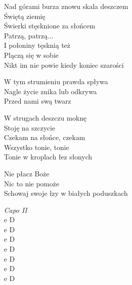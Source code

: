 \begin{text}
    \hfill\break
    Nad górami burza znowu skala deszczem\\
    Świętą ziemię\\
    Świerki stęsknione za słońcem\\
    Patrzą, patrzą...\\
    I połoniny tęsknią też\\
    Plączą się w sobie\\
    Nikt im nie powie kiedy koniec szarości

    W tym strumieniu prawda spływa\\
    Nagle życie znika lub odkrywa\\
    Przed nami swą twarz

    W strugach deszczu moknę\\
    Stoję na szczycie\\
    Czekam na słońce, czekam\\
    Wszystko tonie, tonie\\
    Tonie w kroplach łez słonych

    Nie płacz Boże\\
    Nic to nie pomoże\\
    Schowaj swoje łzy w białych poduszkach
\end{text}
\begin{chord}
    \textit{Capo II}\\
    e D\\
    e D\\
    e D\\
    e D\\
    e D\\
    e D\\
    e D
\end{chord}